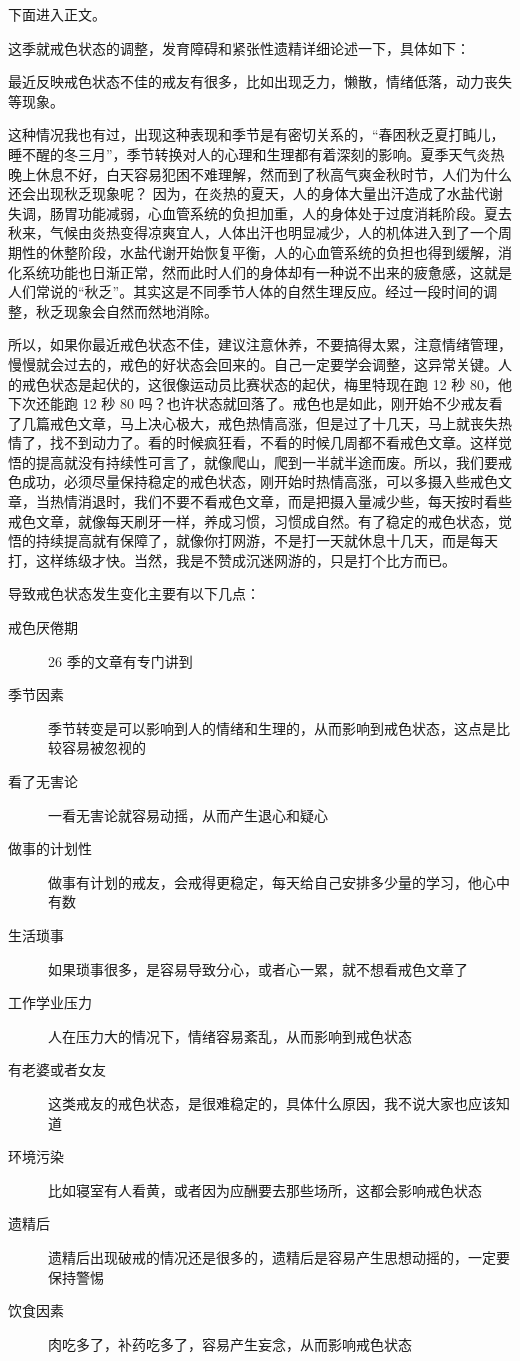 \documentclass[fontset=founder]{ctexart}
\begin{document}
下面进入正文。

这季就戒色状态的调整，发育障碍和紧张性遗精详细论述一下，具体如下：

最近反映戒色状态不佳的戒友有很多，比如出现乏力，懒散，情绪低落，动力丧失等现象。

这种情况我也有过，出现这种表现和季节是有密切关系的，“春困秋乏夏打盹儿，睡不醒的冬三月”，季节转换对人的心理和生理都有着深刻的影响。夏季天气炎热晚上休息不好，白天容易犯困不难理解，然而到了秋高气爽金秋时节，人们为什么还会出现秋乏现象呢？ 因为，在炎热的夏天，人的身体大量出汗造成了水盐代谢失调，肠胃功能减弱，心血管系统的负担加重，人的身体处于过度消耗阶段。夏去秋来，气候由炎热变得凉爽宜人，人体出汗也明显减少，人的机体进入到了一个周期性的休整阶段，水盐代谢开始恢复平衡，人的心血管系统的负担也得到缓解，消化系统功能也日渐正常，然而此时人们的身体却有一种说不出来的疲惫感，这就是人们常说的“秋乏”。其实这是不同季节人体的自然生理反应。经过一段时间的调整，秋乏现象会自然而然地消除。

所以，如果你最近戒色状态不佳，建议注意休养，不要搞得太累，注意情绪管理，慢慢就会过去的，戒色的好状态会回来的。自己一定要学会调整，这异常关键。人的戒色状态是起伏的，这很像运动员比赛状态的起伏，梅里特现在跑 12 秒 80，他下次还能跑 12 秒 80 吗？也许状态就回落了。戒色也是如此，刚开始不少戒友看了几篇戒色文章，马上决心极大，戒色热情高涨，但是过了十几天，马上就丧失热情了，找不到动力了。看的时候疯狂看，不看的时候几周都不看戒色文章。这样觉悟的提高就没有持续性可言了，就像爬山，爬到一半就半途而废。所以，我们要戒色成功，必须尽量保持稳定的戒色状态，刚开始时热情高涨，可以多摄入些戒色文章，当热情消退时，我们不要不看戒色文章，而是把摄入量减少些，每天按时看些戒色文章，就像每天刷牙一样，养成习惯，习惯成自然。有了稳定的戒色状态，觉悟的持续提高就有保障了，就像你打网游，不是打一天就休息十几天，而是每天打，这样练级才快。当然，我是不赞成沉迷网游的，只是打个比方而已。

导致戒色状态发生变化主要有以下几点：

\begin{description}
    \item [戒色厌倦期] 26 季的文章有专门讲到
    \item [季节因素] 季节转变是可以影响到人的情绪和生理的，从而影响到戒色状态，这点是比较容易被忽视的
    \item [看了无害论] 一看无害论就容易动摇，从而产生退心和疑心
    \item [做事的计划性] 做事有计划的戒友，会戒得更稳定，每天给自己安排多少量的学习，他心中有数
    \item [生活琐事] 如果琐事很多，是容易导致分心，或者心一累，就不想看戒色文章了
    \item [工作学业压力] 人在压力大的情况下，情绪容易紊乱，从而影响到戒色状态
    \item [有老婆或者女友] 这类戒友的戒色状态，是很难稳定的，具体什么原因，我不说大家也应该知道
    \item [环境污染] 比如寝室有人看黄，或者因为应酬要去那些场所，这都会影响戒色状态
    \item [遗精后] 遗精后出现破戒的情况还是很多的，遗精后是容易产生思想动摇的，一定要保持警惕
    \item [饮食因素] 肉吃多了，补药吃多了，容易产生妄念，从而影响戒色状态
\end{description}
\end{document}
